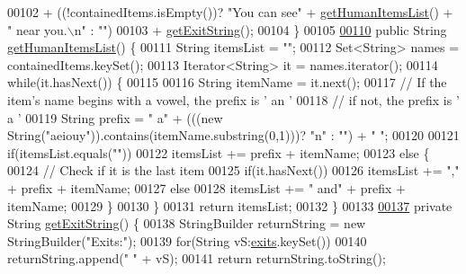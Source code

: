 \begin{DoxyCode}
00102                 + ((!containedItems.isEmpty())? \textcolor{stringliteral}{"You can see"} + 
      \hyperlink{classRoom_ab8a87ad306f77a936873094b479bcde8}{getHumanItemsList}() + \textcolor{stringliteral}{" near you.\(\backslash\)n"} : \textcolor{stringliteral}{""})
00103                 + \hyperlink{classRoom_a2ccc382c07890a9827be232767eb98a0}{getExitString}();
00104     \}
00105 
\hypertarget{Room_8java_source_l00110}{}\hyperlink{classRoom_ab8a87ad306f77a936873094b479bcde8}{00110}     \textcolor{keyword}{public} String \hyperlink{classRoom_ab8a87ad306f77a936873094b479bcde8}{getHumanItemsList}() \{
00111         String itemsList = \textcolor{stringliteral}{""};
00112         Set<String> names = containedItems.keySet();
00113         Iterator<String> it = names.iterator();
00114         \textcolor{keywordflow}{while}(it.hasNext()) \{
00115 
00116             String itemName = it.next();
00117             \textcolor{comment}{// If the item's name begins with a vowel, the prefix is ' an '}
00118             \textcolor{comment}{// if not, the prefix is ' a '}
00119             String prefix = \textcolor{stringliteral}{" a"} + (((\textcolor{keyword}{new} String(\textcolor{stringliteral}{"aeiouy"})).contains(itemName.substring(0,1)))? \textcolor{stringliteral}{"n"} : \textcolor{stringliteral}{""}) +
       \textcolor{stringliteral}{" "};
00120 
00121             \textcolor{keywordflow}{if}(itemsList.equals(\textcolor{stringliteral}{""}))
00122                 itemsList += prefix + itemName;
00123             \textcolor{keywordflow}{else} \{
00124                 \textcolor{comment}{// Check if it is the last item}
00125                 \textcolor{keywordflow}{if}(it.hasNext())
00126                     itemsList += \textcolor{stringliteral}{","} + prefix + itemName;
00127                 \textcolor{keywordflow}{else}
00128                     itemsList += \textcolor{stringliteral}{" and"} + prefix + itemName;
00129             \}
00130         \}
00131         \textcolor{keywordflow}{return} itemsList;
00132     \}
00133 
\hypertarget{Room_8java_source_l00137}{}\hyperlink{classRoom_a2ccc382c07890a9827be232767eb98a0}{00137}     \textcolor{keyword}{private} String \hyperlink{classRoom_a2ccc382c07890a9827be232767eb98a0}{getExitString}() \{
00138         StringBuilder returnString = \textcolor{keyword}{new} StringBuilder(\textcolor{stringliteral}{"Exits:"});
00139         \textcolor{keywordflow}{for}(String vS:\hyperlink{classRoom_ae2a85f60f11d82f6222a926b1a22d05d}{exits}.keySet())
00140             returnString.append(\textcolor{stringliteral}{" "} + vS);
00141         \textcolor{keywordflow}{return} returnString.toString();

\end{DoxyCode}
